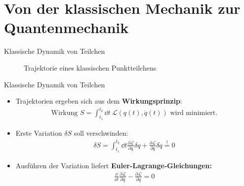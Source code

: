 \section{Von der klassischen Mechanik zur Quantenmechanik}
\begin{frame}{Klassische Dynamik von Teilchen}
\begin{figure}
\caption{Trajektorie eines klassischen Punktteilchens}
\end{figure}
\end{frame}

\begin{frame}{Klassische Dynamik von Teilchen}
\begin{itemize}
	\item Trajektorien ergeben sich aus dem \textbf{Wirkungsprinzip}:
	\begin{align*}
	\text{Wirkung } S = \int_{t_1}^{t_2} \dd t \ \mathcal{L}(q(t),\dot{q}(t)) \text{ wird  minimiert.} 
	\end{align*}
	\item Erste Variation $\delta S$ soll verschwinden:
	\begin{align*}
		\delta S = \int_{t_1}^{t_2} \dd t \frac{\partial \mathcal{L}}{\partial q} \delta q + \frac{\partial \mathcal{L}}{\partial \dot{q}} \delta \dot{q} \overset{!}{ = } 0
	\end{align*}
	\item Ausführen der Variation liefert \textbf{Euler-Lagrange-Gleichungen:} 
	\begin{align*}
		\frac{\dd}{\dd t}\frac{\partial \mathcal{L}}{\partial \dot{q}} - \frac{\partial \mathcal{L}}{\partial q} = 0
	\end{align*}
\end{itemize}
\end{frame}

